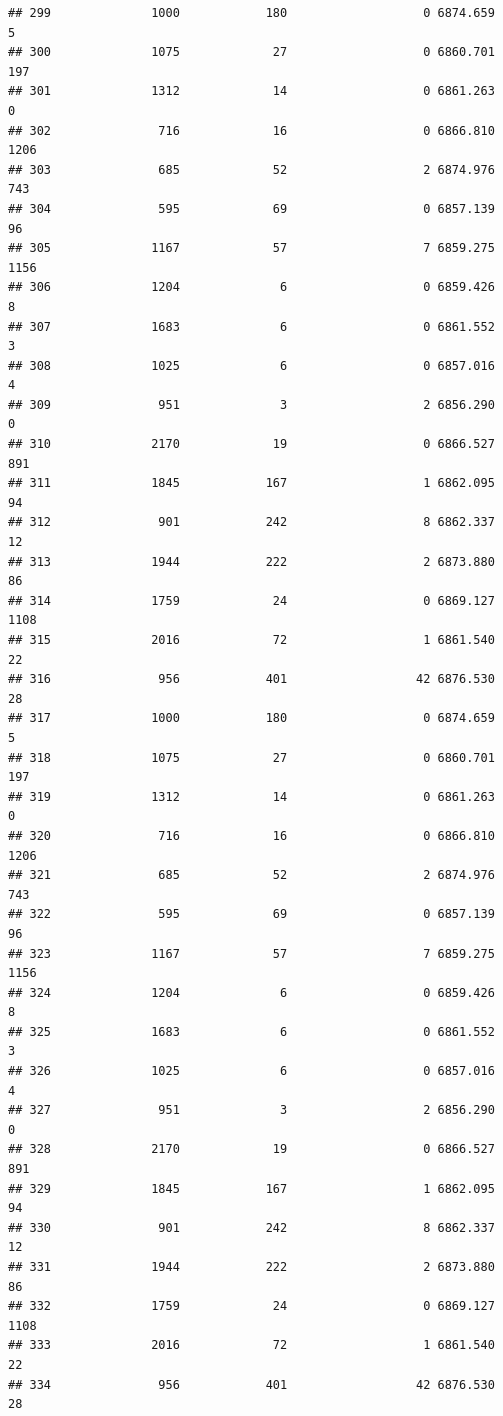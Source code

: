 \documentclass[
]{article}
\begin{document}
\begin{verbatim}
## 299              1000            180                   0 6874.659    5
## 300              1075             27                   0 6860.701  197
## 301              1312             14                   0 6861.263    0
## 302               716             16                   0 6866.810 1206
## 303               685             52                   2 6874.976  743
## 304               595             69                   0 6857.139   96
## 305              1167             57                   7 6859.275 1156
## 306              1204              6                   0 6859.426    8
## 307              1683              6                   0 6861.552    3
## 308              1025              6                   0 6857.016    4
## 309               951              3                   2 6856.290    0
## 310              2170             19                   0 6866.527  891
## 311              1845            167                   1 6862.095   94
## 312               901            242                   8 6862.337   12
## 313              1944            222                   2 6873.880   86
## 314              1759             24                   0 6869.127 1108
## 315              2016             72                   1 6861.540   22
## 316               956            401                  42 6876.530   28
## 317              1000            180                   0 6874.659    5
## 318              1075             27                   0 6860.701  197
## 319              1312             14                   0 6861.263    0
## 320               716             16                   0 6866.810 1206
## 321               685             52                   2 6874.976  743
## 322               595             69                   0 6857.139   96
## 323              1167             57                   7 6859.275 1156
## 324              1204              6                   0 6859.426    8
## 325              1683              6                   0 6861.552    3
## 326              1025              6                   0 6857.016    4
## 327               951              3                   2 6856.290    0
## 328              2170             19                   0 6866.527  891
## 329              1845            167                   1 6862.095   94
## 330               901            242                   8 6862.337   12
## 331              1944            222                   2 6873.880   86
## 332              1759             24                   0 6869.127 1108
## 333              2016             72                   1 6861.540   22
## 334               956            401                  42 6876.530   28

\end{verbatim}
\end{document}

